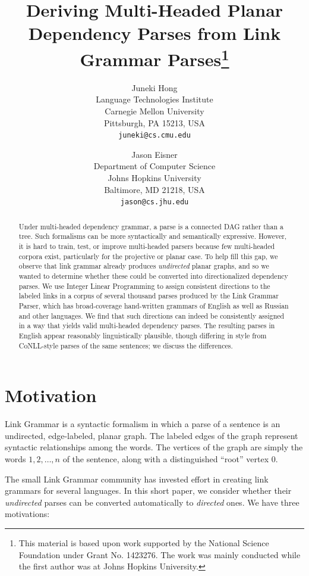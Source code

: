 \documentclass[a4paper,11pt]{article}
\title{Deriving Multi-Headed Planar Dependency Parses from Link
  Grammar Parses\thanks{This material is based upon work supported by the National
    Science Foundation under Grant No. 1423276.  The work was mainly
    conducted while the first author was at Johns Hopkins
    University.\noteJE{anyone else to thank?}}}
\author{
  Juneki Hong \\
  [0.5cm] Language Technologies Institute\\
  Carnegie Mellon University\\
  Pittsburgh, PA 15213, USA\\
  {\texttt{juneki@cs.cmu.edu}}
  \and
  Jason Eisner\\
  [0.5cm] Department of Computer Science\\
  Johns Hopkins University\\
  Baltimore, MD 21218, USA \\
  {\texttt{jason@cs.jhu.edu}}
}
\date{}
\begin{document}
\maketitle

\begin{abstract}
\noindent
Under multi-headed dependency grammar, a parse is a connected DAG rather than a tree.  Such formalisms can be more syntactically and semantically expressive.  However, 
it is hard to train, test, or improve multi-headed parsers because few multi-headed corpora exist, particularly for the projective or planar case.
To help fill this gap, we observe that link grammar already produces {\em undirected} planar graphs, and so we wanted to determine whether these could be converted into directionalized dependency parses.
We use Integer Linear Programming to assign consistent directions to the labeled links in a corpus of several thousand parses produced by the Link Grammar Parser, which has broad-coverage hand-written grammars of English as well as Russian and other languages.  We find that such directions can indeed be consistently assigned in a way that yields valid multi-headed dependency parses. 
The resulting parses in English appear reasonably linguistically plausible, though differing in style from CoNLL-style parses of the same sentences; we discuss the differences.  



\end{abstract}

\thispagestyle{empty}


\section{Motivation}\label{sec:motivation}

Link Grammar \cite{sleator-temperley-1991} is a syntactic formalism in which a parse of a sentence is an undirected, edge-labeled, planar graph.  The labeled edges of the graph represent syntactic relationships among the words.  The vertices of the graph are simply the words $1, 2, \ldots, n$ of the sentence, along with a distinguished ``root'' vertex 0.  

The small Link Grammar community has invested effort in creating link grammars for several languages.  In this short paper, we consider whether their {\em undirected} parses can be converted automatically to {\em directed} ones.  We have three motivations:
\end{document}
